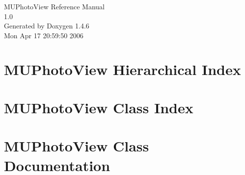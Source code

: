 \documentclass[a4paper]{book}
\begin{document}
\begin{titlepage}
\vspace*{7cm}
\begin{center}
{\Large MUPhoto\-View Reference Manual\\[1ex]\large 1.0 }\\
\vspace*{1cm}
{\large Generated by Doxygen 1.4.6}\\
\vspace*{0.5cm}
{\small Mon Apr 17 20:59:50 2006}\\
\end{center}
\end{titlepage}
\clearemptydoublepage
{}
\tableofcontents
\clearemptydoublepage
{}
\chapter{MUPhoto\-View Hierarchical Index}

\chapter{MUPhoto\-View Class Index}

\chapter{MUPhoto\-View Class Documentation}


\printindex
\end{document}
